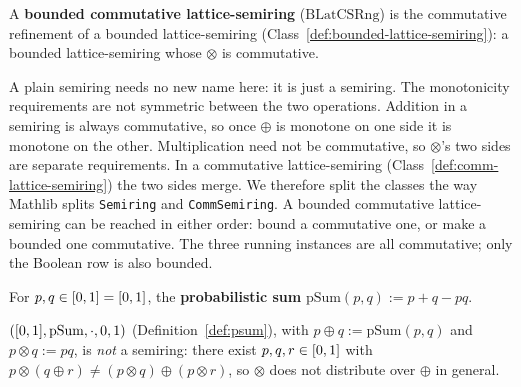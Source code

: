 \begin{class}
\label{def:bounded-comm-lattice-semiring}
\leanok
A \textbf{bounded commutative lattice-semiring} ($\mathrm{BLatCSRng}$)
is the commutative refinement of a bounded lattice-semiring
(Class~\ref{def:bounded-lattice-semiring}): a bounded
lattice-semiring whose $\otimes$ is commutative.
\end{class}

A plain semiring needs no new name here: it is just a semiring. The
monotonicity requirements are not symmetric between the two
operations. Addition in a semiring is always commutative, so once
$\oplus$ is monotone on one side it is monotone on the other.
Multiplication need not be commutative, so $\otimes$'s two sides are
separate requirements. In a commutative lattice-semiring
(Class~\ref{def:comm-lattice-semiring}) the two sides merge. We
therefore split the classes the way Mathlib splits
\texttt{Semiring} and \texttt{CommSemiring}. A bounded commutative
lattice-semiring can be reached in either order: bound a commutative
one, or make a bounded one commutative. The three running instances
are all commutative; only the Boolean row is also bounded.

\begin{definition}
\label{def:psum}
\leanok
For $p,q \in [0,1] = [0,1]$, the \textbf{probabilistic sum}
$\mathrm{pSum}(p,q) := p+q-pq$.
\end{definition}

\begin{lemma}
\label{lem:prob-not-semiring}
$([0,1], \mathrm{pSum}, \cdot, 0, 1)$ (Definition~\ref{def:psum}), with
$p \oplus q := \mathrm{pSum}(p,q)$ and $p \otimes q := pq$, is
\emph{not} a semiring: there exist $p,q,r \in [0,1]$ with $p \otimes
(q \oplus r) \ne (p\otimes q) \oplus (p \otimes r)$, so $\otimes$ does
not distribute over $\oplus$ in general.
\leanok
\end{lemma}


